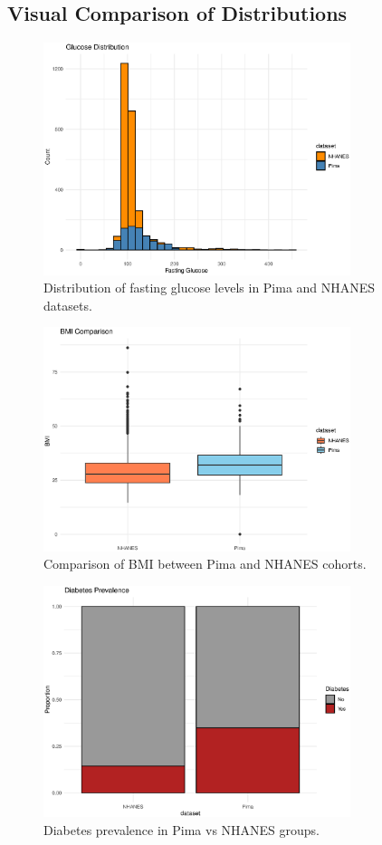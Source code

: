 \documentclass[12pt]{article}
\begin{document}
\subsection{Visual Comparison of Distributions}

\begin{figure}[H]
\centering
\includegraphics[width=0.8\textwidth]{glucose_histogram.eps}
\caption{Distribution of fasting glucose levels in Pima and NHANES datasets.}
\end{figure}

\begin{figure}[H]
\centering
\includegraphics[width=0.8\textwidth]{bmi_boxplot.eps}
\caption{Comparison of BMI between Pima and NHANES cohorts.}
\end{figure}

\begin{figure}[H]
\centering
\includegraphics[width=0.8\textwidth]{diabetes_barplot.eps}
\caption{Diabetes prevalence in Pima vs NHANES groups.}
\end{figure}
\end{document}
